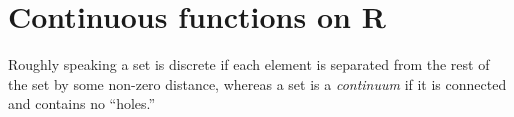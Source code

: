 \chapter{Continuous functions on R}\label{i:ch:9}

\begin{note}
  Roughly speaking a set is discrete if each element is separated from the rest of the set by some non-zero distance, whereas a set is a \emph{continuum} if it is connected and contains no ``holes.''
\end{note}











